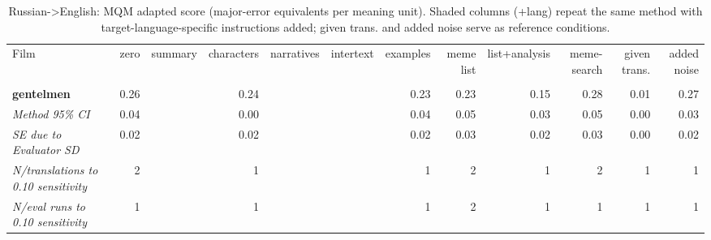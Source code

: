 \begin{table}[ht]
\centering
\begin{adjustbox}{width=\textwidth}
\begin{tabular}{lrrrrrrrrr|rr}
Film & zero & summary & characters & narratives & intertext & examples & meme list & list+analysis & meme-search & \multicolumn{1}{|r}{given trans.} & added noise \\
 &  &  &  &  &  &  &  &  &  &  &  \\
\hline
\textbf{gentelmen} & 0.26 &  & 0.24 &  &  & 0.23 & 0.23 & 0.15 & 0.28 & 0.01 & 0.27 \\

\emph{Method 95\% CI} & 0.04 &  & 0.00 &  &  & 0.04 & 0.05 & 0.03 & 0.05 & 0.00 & 0.03 \\

\emph{SE due to Evaluator SD} & 0.02 &  & 0.02 &  &  & 0.02 & 0.03 & 0.02 & 0.03 & 0.00 & 0.02 \\

\emph{N/translations to 0.10 sensitivity} & 2 &  & 1 &  &  & 1 & 2 & 1 & 2 & 1 & 1 \\

\emph{N/eval runs to 0.10 sensitivity} & 1 &  & 1 &  &  & 1 & 2 & 1 & 1 & 1 & 1 \\

\hline
\end{tabular}
\end{adjustbox}
\caption{Russian->English: MQM adapted score (major-error equivalents per meaning unit). Shaded columns (+lang) repeat the same method with target-language-specific instructions added; given trans. and added noise serve as reference conditions.}
\label{tab:mqm-method-comparison}
\end{table}

